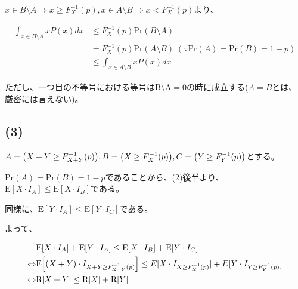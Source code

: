 \documentclass[a4paper, 10pt, dvipdfmx]{jlreq}
\begin{document}
$x \in B \setminus A \Rightarrow x \geq F_X^{-1}(p), x \in A \setminus B \Rightarrow x < F_X^{-1}(p)$より、

\begin{align*}
    \int_{x\in B \setminus A} xP(x)dx & \leq F_X^{-1}(p)\mathrm{Pr}(B \setminus A)                                              \\
                                      & = F_X^{-1}(p)\mathrm{Pr}(A \setminus B) \; (\because \mathrm{Pr}(A)=\mathrm{Pr}(B)=1-p) \\
                                      & \leq \int_{x\in A \setminus B} xP(x)dx
\end{align*}

ただし、一つ目の不等号における等号は$\mathrm{B \setminus A}=0$の時に成立する($A=B$とは、厳密には言えない)。

\subsection*{(3)}

$A=\qty(X+Y \geq F_{X+Y}^{-1}(p)),B=\qty(X \geq F_X^{-1}(p)),C=\qty(Y \geq F_Y^{-1}(p))$とする。

$\mathrm{Pr}(A)=\mathrm{Pr}(B)=1-p$であることから、(2)後半より、$\mathrm{E}[X \cdot I_A] \leq \mathrm{E}[X \cdot I_B]$である。

同様に、$\mathrm{E}[Y \cdot I_A] \leq \mathrm{E}[Y \cdot I_C]$である。

よって、

\begin{align*}
                    & \mathrm{E}[X \cdot I_A]+ \mathrm{E}[Y \cdot I_A] \leq \mathrm{E}[X \cdot I_B] + \mathrm{E}[Y \cdot I_C]                             \\
    \Leftrightarrow & \mathrm{E}\qty[(X+Y) \cdot I_{X+Y \geq F_{X+Y}^{-1}(p)}] \leq E[X \cdot I_{X \geq F_X^{-1}(p)}] + E[Y \cdot I_{Y \geq F_Y^{-1}(p)}] \\
    \Leftrightarrow & \mathrm{R}[X+Y] \leq \mathrm{R}[X] + \mathrm{R}[Y]
\end{align*}
\end{document}
